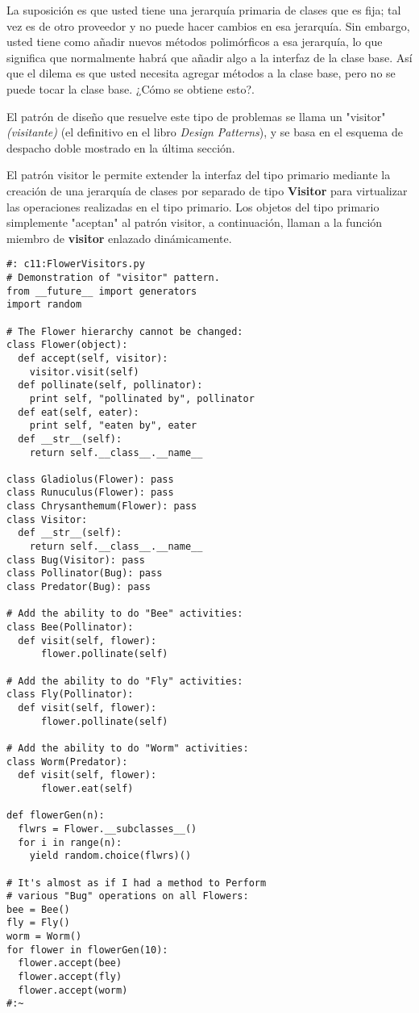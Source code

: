La suposición es que usted tiene una jerarquía primaria de clases que es fija; tal vez es de otro proveedor y no puede hacer cambios en esa jerarquía. Sin embargo, usted tiene como añadir nuevos métodos polimórficos a esa jerarquía, lo que significa que normalmente habrá que añadir algo a la interfaz de la clase base. Así que el dilema es que usted necesita agregar métodos a la clase base, pero no se puede tocar la clase base. ¿Cómo se obtiene esto?.     \newline

El patrón de diseño que resuelve este tipo de problemas se llama un "visitor" \textit{(visitante)} (el definitivo en el libro \textit{Design Patterns}), y se basa en el esquema de despacho doble mostrado en la última sección.    \newline

El patrón visitor le permite extender la interfaz del tipo primario mediante la creación de una jerarquía de clases por separado de tipo \textbf{Visitor} para virtualizar las operaciones realizadas en el tipo primario. Los objetos del tipo primario simplemente "aceptan" al patrón visitor, a continuación, llaman a la función miembro de \textbf{visitor} enlazado dinámicamente.   \newline

\begin{lstlisting} 
#: c11:FlowerVisitors.py 
# Demonstration of "visitor" pattern. 
from __future__ import generators 
import random 

# The Flower hierarchy cannot be changed: 
class Flower(object):   
  def accept(self, visitor): 
    visitor.visit(self) 
  def pollinate(self, pollinator): 
    print self, "pollinated by", pollinator 
  def eat(self, eater): 
    print self, "eaten by", eater 
  def __str__(self):  
    return self.__class__.__name__
    
class Gladiolus(Flower): pass 
class Runuculus(Flower): pass 
class Chrysanthemum(Flower): pass  
class Visitor: 
  def __str__(self):  
    return self.__class__.__name__ 
class Bug(Visitor): pass 
class Pollinator(Bug): pass 
class Predator(Bug): pass 

# Add the ability to do "Bee" activities: 
class Bee(Pollinator): 
  def visit(self, flower): 
      flower.pollinate(self) 
      
# Add the ability to do "Fly" activities: 
class Fly(Pollinator): 
  def visit(self, flower): 
      flower.pollinate(self) 
      
# Add the ability to do "Worm" activities: 
class Worm(Predator): 
  def visit(self, flower): 
      flower.eat(self) 
      
def flowerGen(n): 
  flwrs = Flower.__subclasses__() 
  for i in range(n): 
    yield random.choice(flwrs)() 
    
# It's almost as if I had a method to Perform 
# various "Bug" operations on all Flowers: 
bee = Bee() 
fly = Fly() 
worm = Worm() 
for flower in flowerGen(10): 
  flower.accept(bee) 
  flower.accept(fly) 
  flower.accept(worm) 
#:~ 
\end{lstlisting}



